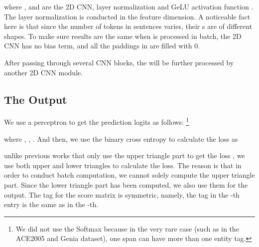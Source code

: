 \documentclass[11pt]{article}
\begin{document}
where ,  and  are the 2D CNN, layer normalization \cite{DBLP:journals/corr/BaKH16} and GeLU activation function \cite{DBLP:journals/corr/HendrycksG16}. The layer normalization is conducted in the feature dimension. A noticeable fact here is that since the number of tokens  in sentences varies, their s are of different shapes. To make sure results are the same when  is processed in batch, the 2D CNN has no bias term, and all the paddings in  are filled with 0. 

After passing through several CNN blocks, the  will be further processed by another 2D CNN module. 

\subsection{The Output}
We use a perceptron to get the prediction logits as follows: \footnote{We did not use the Softmax because in the very rare case (such as in the ACE2005 and Genia dataset), one span can have more than one entity tag.}

where , , . And then, we use the binary cross entropy to calculate the loss as 

unlike previous works that only use the upper triangle part to get the loss \cite{DBLP:conf/acl/YuBP20,DBLP:conf/acl/Zhu022},  we use both upper and lower triangles to calculate the loss. The reason is that in order to conduct batch computation, we cannot solely compute the upper triangle part. Since the lower triangle part has been computed, we also use them for the output. The tag for the score matrix is symmetric, namely, the tag in the -th entry is the same as in the -th. 
\end{document}
